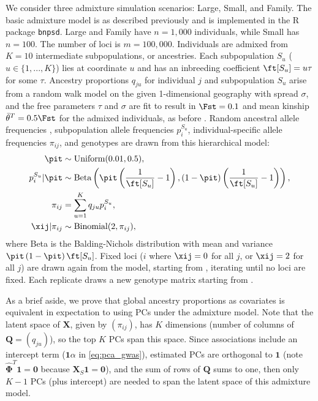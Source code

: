 \documentclass[11pt]{article}
\begin{document}
We consider three admixture simulation scenarios: Large, Small, and Family.
The basic admixture model is as described previously \citep{ochoa_estimating_2021} and is implemented in the R package \texttt{bnpsd}.
Large and Family have $n = 1,000$ individuals, while Small has $n = 100$.
The number of loci is $m = 100,000$.
Individuals are admixed from $K = 10$ intermediate subpopulations, or ancestries.
Each subpopulation $S_u$ ($u \in \{ 1, ..., K \}$) lies at coordinate $u$ and has an inbreeding coefficient $\ft[S_u] = u \tau$ for some $\tau$.
Ancestry proportions $q_{ju}$ for individual $j$ and subpopulation $S_u$ arise from a random walk model on the given 1-dimensional geography with spread $\sigma$, and the free parameters $\tau$ and $\sigma$ are fit to result in $\Fst = 0.1$ and mean kinship $\bar{\theta}^T = 0.5 \Fst$ for the admixed individuals, as before \citep{ochoa_estimating_2021}.
Random ancestral allele frequencies \pit, subpopulation allele frequencies $p_i^{S_u}$, individual-specific allele frequencies $\pi_{ij}$, and genotypes \xij are drawn from this hierarchical model:
\begin{align*}
  \pit
  &\sim
    \text{Uniform}( 0.01, 0.5 )
    , \\
  p_i^{S_u} | \pit
  &\sim
    \text{Beta} \left(
    \pit \left( \frac{1}{ \ft[S_u] } - 1 \right),
    \left( 1 - \pit \right) \left( \frac{1}{ \ft[S_u] } - 1 \right)
    \right)
    , \\
  \pi_{ij}
  &=
    \sum_{u = 1}^K q_{ju} p_i^{S_u}
    , \\
  \xij | \pi_{ij}
  &\sim
    \text{Binomial}(2, \pi_{ij})
    ,
\end{align*}
where Beta is the Balding-Nichols distribution \citep{balding_method_1995} with mean \pit and variance $\pit \left( 1 - \pit \right) \ft[S_u]$.
Fixed loci ($i$ where $\xij = 0$ for all $j$, or $\xij = 2$ for all $j$) are drawn again from the model, starting from \pit, iterating until no loci are fixed.
Each replicate draws a new genotype matrix starting from \pit.

As a brief aside, we prove that global ancestry proportions as covariates is equivalent in expectation to using PCs under the admixture model.
Note that the latent space of $\mathbf{X}$, given by $(\pi_{ij})$, has $K$ dimensions (number of columns of $\mathbf{Q} = (q_{ju})$), so the top $K$ PCs span this space.
Since associations include an intercept term ($\mathbf{1} \alpha$ in \cref{eq:pca_gwas}), estimated PCs are orthogonal to $\mathbf{1}$ (note $\mathbf{\hat{\Phi}}^T \mathbf{1} = \mathbf{0}$ because $\mathbf{X}_S \mathbf{1} = \mathbf{0}$), and the sum of rows of $\mathbf{Q}$ sums to one, then only $K-1$ PCs (plus intercept) are needed to span the latent space of this admixture model.
\end{document}
